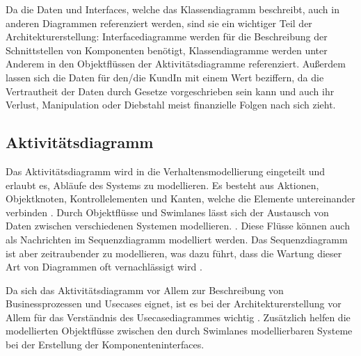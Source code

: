 Da die Daten und Interfaces, welche das Klassendiagramm beschreibt, auch in anderen Diagrammen referenziert werden, sind sie ein wichtiger Teil der Architekturerstellung: Interfacediagramme werden für die Beschreibung der Schnittstellen von Komponenten benötigt, Klassendiagramme werden unter Anderem in den Objektflüssen der Aktivitätsdiagramme referenziert. Außerdem lassen sich die Daten für den/die KundIn mit einem Wert beziffern, da die Vertrautheit der Daten durch Gesetze vorgeschrieben sein kann und auch ihr Verlust, Manipulation oder Diebstahl meist finanzielle Folgen nach sich zieht.


\subsection{Aktivitätsdiagramm}
Das Aktivitätsdiagramm wird in die Verhaltensmodellierung eingeteilt und erlaubt es, Abläufe des Systems zu modellieren. Es besteht aus Aktionen, Objektknoten, Kontrollelementen und Kanten, welche die Elemente untereinander verbinden \cite[S. 264]{glasklar}. Durch Objektflüsse und Swimlanes lässt sich der Austausch von Daten zwischen verschiedenen Systemen modellieren. \cite[S. 268]{glasklar}. Diese Flüsse können auch als Nachrichten im Sequenzdiagramm modelliert werden. Das Sequenzdiagramm ist aber zeitraubender zu modellieren, was dazu führt, dass die Wartung dieser Art von Diagrammen oft vernachlässigt wird \cite[S. 414]{glasklar}. \cite[S. 263-274]{glasklar}


Da sich das Aktivitätsdiagramm vor Allem zur Beschreibung von Businessprozessen und Usecases eignet, ist es bei der Architekturerstellung vor Allem für das Verständnis des Usecasediagrammes wichtig \cite[S. 271-272]{glasklar}. Zusätzlich helfen die modellierten Objektflüsse zwischen den durch Swimlanes modellierbaren Systeme bei der Erstellung der Komponenteninterfaces.